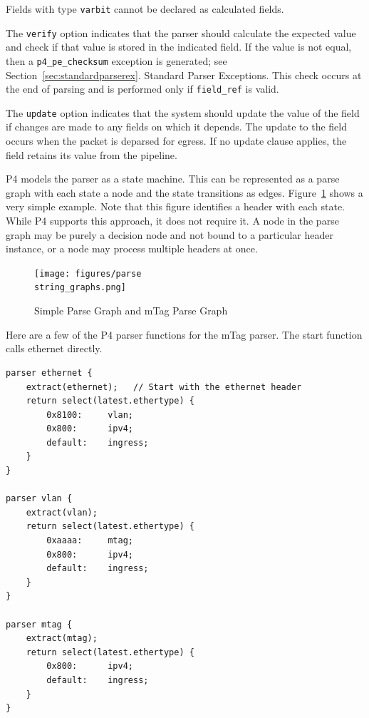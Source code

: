 \documentclass[12pt]{article}
\begin{document}
Fields with type \texttt{varbit} cannot be declared as calculated fields.

The \texttt{verify} option indicates that the parser should calculate the expected 
value and check if that value is stored in the indicated field. If the value 
is not equal, then a \texttt{p4_pe_checksum} exception is generated; see Section~\ref{sec:standardparserex}. 
Standard Parser Exceptions. This check occurs at the end of parsing and is 
performed only if \texttt{field_ref} is valid.

The \texttt{update} option indicates that the system should update the value of the 
field if changes are made to any fields on which it depends. The update to 
the field occurs when the packet is deparsed for egress. If no update clause 
applies, the field retains its value from the \matchaction pipeline.


P4 models the parser as a state machine. This can be represented as a parse 
graph with each state a node and the state transitions as edges. Figure~\ref{fig:parsegraphs} 
shows a very simple example. Note that this figure identifies a header with 
each state. While P4 supports this approach, it does not require it. A node 
in the parse graph may be purely a decision node and not bound to a particular 
header instance, or a node may process multiple headers at once.

\begin{figure}[h!]
    \centering
    \texttt{[image: figures/parse\\string\_graphs.png]}
    \caption{Simple Parse Graph and mTag Parse Graph}
    \label{fig:parsegraphs}
\end{figure}


Here are a few of the P4 parser functions for the mTag parser. The 
start function calls ethernet directly.

\begin{lstlisting}[style=P4style]
parser ethernet {
    extract(ethernet);   // Start with the ethernet header
    return select(latest.ethertype) {
        0x8100:     vlan;
        0x800:      ipv4;
        default:    ingress;
    }
}

parser vlan {
    extract(vlan);
    return select(latest.ethertype) {
        0xaaaa:     mtag;
        0x800:      ipv4;
        default:    ingress;
    }
}

parser mtag {
    extract(mtag);
    return select(latest.ethertype) {
        0x800:      ipv4;
        default:    ingress;
    }
}
\end{lstlisting}
\end{document}
